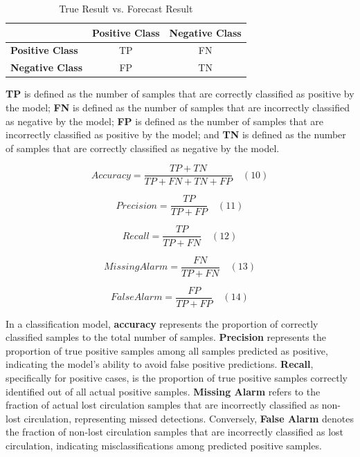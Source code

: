 \documentclass[journal,article,submit,pdftex,moreauthors]{Definitions/mdpi}
\begin{document}
\begin{table}[H]
\centering
\caption{True Result vs. Forecast Result}
\begin{tabular}{lcc}
\hline
                      & \textbf{Positive Class} & \textbf{Negative Class} \\ \hline
\textbf{Positive Class} & TP                      & FN                      \\
\textbf{Negative Class} & FP                      & TN                      \\ \hline
\end{tabular}

\label{True Result vs. Forecast Result}
\end{table}
\textbf{TP} is defined as the number of samples that are correctly classified as positive by the model;
\textbf{FN} is defined as the number of samples that are incorrectly classified as negative by the model;
\textbf{FP} is defined as the number of samples that are incorrectly classified as positive by the model; and
\textbf{TN} is defined as the number of samples that are correctly classified as negative by the model.

$$ A c c u r a c y = \frac { T P + T N } { T P + F N + T N + F P }\quad (10)$$

$$ P r e c i s i o n = \frac { T P } { T P + F P }\quad (11)$$

$$ R e c a l l = \frac { T P } { T P + F N } \quad (12)$$

$$ M i s sin g A l a r m = \frac { F N } { T P + F N } \quad (13)$$

$$ F a l s e A l a r m = \frac { F P } { T P + F P } \quad (14)$$

In a classification model, \textbf{accuracy} represents the proportion of correctly classified samples to the total number of samples. \textbf{Precision} represents the proportion of true positive samples among all samples predicted as positive, indicating the model's ability to avoid false positive predictions. \textbf{Recall}, specifically for positive cases, is the proportion of true positive samples correctly identified out of all actual positive samples. \textbf{Missing Alarm} refers to the fraction of actual lost circulation samples that are incorrectly classified as non-lost circulation, representing missed detections. Conversely, \textbf{False Alarm} denotes the fraction of non-lost circulation samples that are incorrectly classified as lost circulation, indicating misclassifications among predicted positive samples. 
\end{document}
